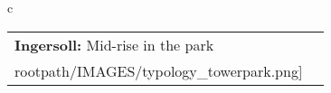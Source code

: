 \begin{table}[H]
        \begin{tabular}{c}
        \begin{tabular}{m{1.5in} m{2in}}
\textbf{Ingersoll:} {Mid-rise in the park} & \texttt{[image: \\rootpath/IMAGES/typology\_towerpark.png]}
\end{tabular}\end{tabular}
        \end{table}